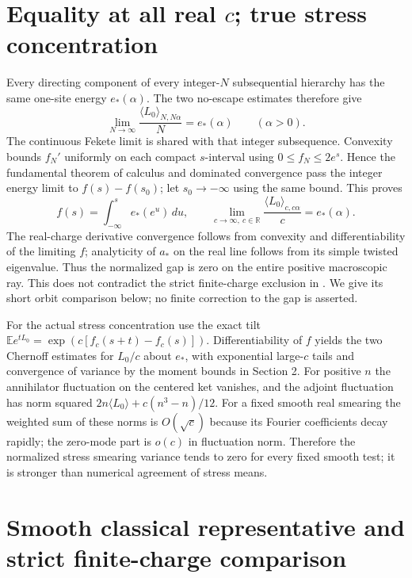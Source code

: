 \documentclass[11pt]{article}
\begin{document}
\section{\texorpdfstring{Equality at all real \(c\); true stress concentration}{Equality at all real c; true stress concentration}}\label{equality-at-all-real-c-true-stress-concentration}

Every directing component of every integer-\(N\) subsequential hierarchy has the same one-site energy \(e_*(\alpha)\). The two no-escape estimates therefore give
\[
 \lim_{N\to\infty}\frac{\langle L_0\rangle_{N,N\alpha}}N=e_*(\alpha)
 \qquad(\alpha>0).
\] The continuous Fekete limit is shared with that integer subsequence. Convexity bounds \(f_N'\) uniformly on each compact \(s\)-interval using \(0\le f_N\le2e^s\). Hence the fundamental theorem of calculus and dominated convergence pass the integer energy limit to \(f(s)-f(s_0)\); let \(s_0\to-\infty\) using the same bound. This proves \[
 f(s)=\int_{-\infty}^s e_*(e^u)\,du,\qquad
 \lim_{c\to\infty,\ c\in\mathbb R}\frac{\langle L_0\rangle_{c,c\alpha}}c
                      = e_*(\alpha).
\] The real-charge derivative convergence follows from convexity and differentiability of the limiting \(f\); analyticity of \(a_*\) on the real line follows from its simple twisted eigenvalue. Thus the normalized gap is zero on the entire positive macroscopic ray. This does not contradict the strict finite-charge exclusion in \cite{p34}. We give its short orbit comparison below; no finite correction to the gap is asserted.

For the actual stress concentration use the exact tilt \(\mathbb E e^{tL_0}=\exp(c[f_c(s+t)-f_c(s)])\). Differentiability of \(f\) yields the two Chernoff estimates for \(L_0/c\) about \(e_*\), with exponential large-\(c\) tails and convergence of variance by the moment bounds in Section 2. For positive \(n\) the annihilator fluctuation on the centered ket vanishes, and the adjoint fluctuation has norm squared \(2n\langle L_0\rangle+c(n^3-n)/12\). For a fixed smooth real smearing the weighted sum of these norms is \(O(\sqrt c)\) because its Fourier coefficients decay rapidly; the zero-mode part is \(o(c)\) in fluctuation norm. Therefore the normalized stress smearing variance tends to zero for every fixed smooth test; it is stronger than numerical agreement of stress means.

\section{Smooth classical representative and strict finite-charge comparison}
\label{sec:classical}
\end{document}
